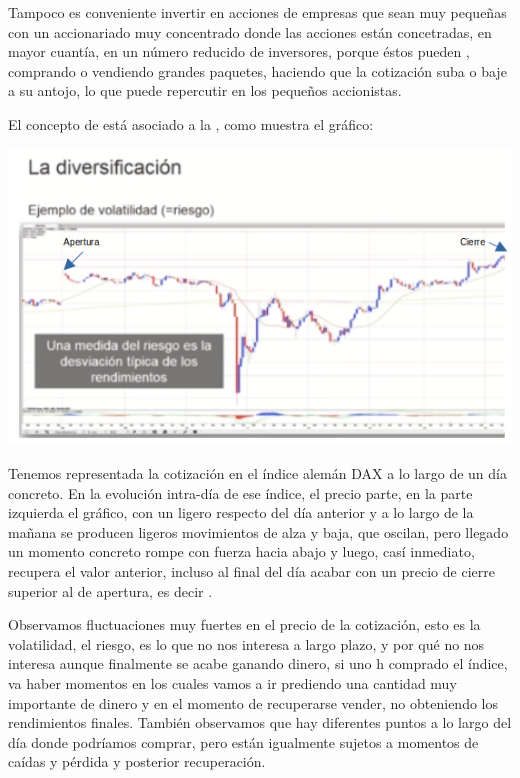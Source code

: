 Tampoco es conveniente invertir en acciones de empresas que sean muy pequeñas con un accionariado muy concentrado donde las acciones están concetradas, en mayor cuantía, en un número reducido de inversores, porque éstos pueden , comprando o vendiendo grandes paquetes, haciendo que la cotización suba o baje a su antojo, lo que puede repercutir en los pequeños accionistas.

El concepto de  está asociado a la , como muestra el gráfico:
\begin{center}
    \includegraphics[scale=.75]{images/diversificacion-riesgo.png}
\end{center}
Tenemos representada la cotización en el índice alemán DAX a lo largo de un día concreto. En la evolución intra-día de ese índice, el precio parte, en la parte izquierda el gráfico, con un ligero  respecto del día anterior y a lo largo de la mañana se producen ligeros movimientos de alza y baja, que oscilan, pero llegado un momento concreto rompe con fuerza hacia abajo y luego, casí inmediato, recupera el valor anterior, incluso al final del día acabar con un precio de cierre superior al de apertura, es decir .

Observamos fluctuaciones muy fuertes en el precio de la cotización, esto es la volatilidad, el riesgo, es lo que no nos interesa a largo plazo, y por qué no nos interesa aunque finalmente se acabe ganando dinero, si uno h comprado el índice, va haber momentos en los cuales vamos a ir prediendo una cantidad muy importante de dinero y en el momento de recuperarse vender, no obteniendo los rendimientos finales. También observamos que hay diferentes puntos a lo largo del día donde podríamos comprar, pero están igualmente sujetos a momentos de caídas y pérdida y posterior recuperación.

